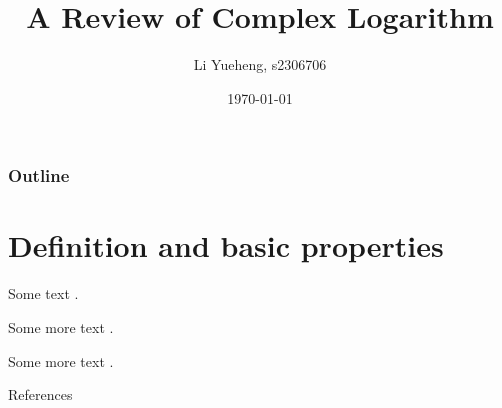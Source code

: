 \documentclass{beamer}
\title[Complex Logarithm]{A Review of Complex Logarithm}
\author{Li Yueheng, s2306706}
\institute{The University of Edinburgh}
\date{\today}
\begin{document}
\begin{frame}
  \titlepage
\end{frame}


\begin{frame}
\frametitle{Outline}
\tableofcontents
\end{frame}


\section{Definition and basic properties}


\begin{frame}
	
Some text \autocite[Proposition~3.iii]{A01}.

Some more text \autocite[Proposition~3.iii on \pno~99]{A01}.

Some more text \autocite[99]{A01}.

\end{frame}







\begin{frame}{References}
\printbibliography %
\end{frame}
\end{document}
